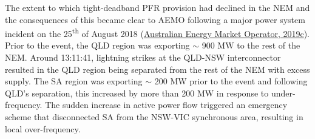 \documentclass[12pt,a4paper,]{report}
\begin{document}
The extent to which tight-deadband PFR provision had declined in the NEM
and the consequences of this became clear to AEMO following a major
power system incident on the 25\textsuperscript{th} of August 2018
(\protect\hyperlink{ref-australianenergymarketoperatorFinalReportQueensland2019}{Australian
Energy Market Operator, 2019c}). Prior to the event, the QLD region was
exporting \(\sim\) 900 MW to the rest of the NEM. Around 13:11:41,
lightning strikes at the QLD-NSW interconnector resulted in the QLD
region being separated from the rest of the NEM with excess supply. The
SA region was exporting \(\sim\) 200 MW prior to the event and following
QLD's separation, this increased by more than 200 MW in response to
under-frequency. The sudden increase in active power flow triggered an
emergency scheme that disconnected SA from the NSW-VIC synchronous area,
resulting in local over-frequency.
\end{document}
